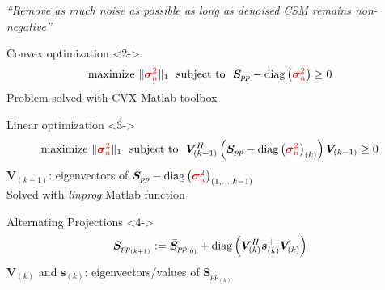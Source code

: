 \documentclass[10pt,xcolor=x11names,compress, notes=show]{beamer}%
\newcommand{\diag}[1]{\operatorname{diag}\left(#1\right)}
\newcommand{\citeTransp}[1]{\color{fg!50} \citep{#1}}
\begin{document}
\begin{frame}{\insertsectionhead}	
\hspace{-0.6cm}\textit{\small ``Remove as much noise as possible as long as denoised CSM remains non-negative''}
	\begin{block}{\normalsize Convex optimization   \citeTransp{Hald2017}}<2->
		\begin{equation*}
        			\text{maximize~} \| \textcolor{red}{\bm{\sigma}_{n}^2}\|_1 \text{~~subject to~~} \bm{S}_{pp}- \diag{\textcolor{red}{\bm{\sigma}_n^2}} \geq 0
		\end{equation*}
		{\small Problem solved with CVX Matlab toolbox}
	\end{block}
	\begin{block}{\normalsize Linear optimization \citeTransp{dougherty2016}}<3->
		\vspace{-0.2cm}
		\begin{equation*}
			\text{maximize~} \| \textcolor{red}{\bm{\sigma}_{n}^2}\|_1   \text{~~subject to~~}  \bm{V}^{H}_{(k-1)} \left( \bm{S}_{pp}- \diag{\textcolor{red}{\bm{\sigma}_n^2}}_{(k)} \right) \bm{V}_{(k-1)} \geq 0 
		\end{equation*}
		 $\bm{V}_{(k-1)}$: eigenvectors of $\bm{S}_{pp}-\diag{\textcolor{red}{\bm{\sigma}_n^2}}_{(1,...,k-1)} $\\[1pt]
		{\small Solved with \textit{linprog} Matlab function}
	\end{block}
	\begin{block}{\normalsize Alternating Projections  \citeTransp{leclere:hal-01279944}}<4->
		\begin{equation*}
        			 \bm{S}_{{pp}_{(k+1)}} := \bar{\bm{S}}_{{pp}_{(0)}} + \diag{\bm{V}^{H}_{(k)} \bm{s}_{(k)}^{\textcolor{orange}{\textbf{+}}}\bm{V}^{~}_{(k)}}
		\end{equation*}
		$\bm{V}_{(k)}$ and $\bm{s}_{(k)}$: eigenvectors/values of  $\bm{S}_{{pp}_{(k)}}$\\[1pt]
	\end{block}	
\end{frame}

\end{document}

